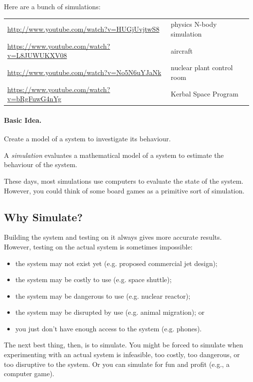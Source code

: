 




Here are a bunch of simulations:

\begin{tabular}{ll}
\url{http://www.youtube.com/watch?v=HUGjUvjtwS8} & physics N-body simulation \\
\url{https://www.youtube.com/watch?v=L8JUWUKXV08} & aircraft \\
\url{http://www.youtube.com/watch?v=No5N6uYJaNk} & nuclear plant control room\\
\url{https://www.youtube.com/watch?v=bRgFuwG4nYg} & Kerbal Space Program
\end{tabular}

\paragraph{Basic Idea.} Create a model of a system to investigate 
its behaviour.

A \emph{simulation} evaluates a mathematical model of a system to
estimate the behaviour of the system.

These days, most simulations use computers to evaluate the state of
the system. However, you could think of some board games as a
primitive sort of simulation.

\subsection*{Why Simulate?}
Building the system and testing on it always gives more accurate
results. However, testing on the actual system is sometimes impossible:
\begin{itemize}
\item the system may not exist yet (e.g. proposed commercial jet design);
\item the system may be costly to use (e.g. space shuttle);
\item the system may be dangerous to use (e.g. nuclear reactor);
\item the system may be disrupted by use (e.g. animal migration); or
\item you just don't have enough access to the system (e.g. phones).
\end{itemize}

The next best thing, then, is to simulate. You might be forced to
simulate when experimenting with an actual system is infeasible, too
costly, too dangerous, or too disruptive to the system. Or you can simulate
for fun and profit (e.g., a computer game).


